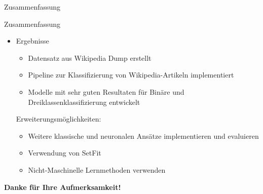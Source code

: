 \documentclass[aspectratio=169]{beamer} %
\begin{document}
\begin{frame}{Zusammenfassung}
    \begin{block}{Zusammenfassung}
        \begin{itemize}
            \item Ergebnisse
                  \begin{itemize}
                      \item Datensatz aus Wikipedia Dump erstellt
                      \item Pipeline zur Klassifizierung von Wikipedia-Artikeln implementiert
                      \item Modelle mit sehr guten Resultaten für Binäre und Dreiklassenklassifizierung entwickelt
                  \end{itemize}
                  Erweiterungsmöglichkeiten:
                  \begin{itemize}
                      \item Weitere klassische und neuronalen Ansätze implementieren und evaluieren
                      \item Verwendung von SetFit
                      \item Nicht-Maschinelle Lernmethoden verwenden
                  \end{itemize}
        \end{itemize}
    \end{block}
    
    \begin{center}
    \textbf{Danke für Ihre Aufmerksamkeit!}
    \end{center}
    
    \nocite{hendrycks2023gaussianerrorlinearunits}
    \nocite{Sanh2019DistilBERTAD}
    \nocite{tunstall2022efficientfewshotlearningprompts}
    \nocite{9783960108535}
    \nocite{article_comparing_LLMs}
    \nocite{Attention}
    \nocite{BERTReference}
    \nocite{das2024languageagnosticmodelingwikipediaarticles}
    \nocite{DBLP:journals/corr/BojanowskiGJM16}
    \nocite{eyheramendy_2003}
    \nocite{huggingfaceQuelle}
    \nocite{maron_1961}
    \nocite{pytorchRef}
    \nocite{shavarani2020multiclassmultilingualclassificationwikipedia}
    \nocite{skicitLearnRef}
    \nocite{textCategorizationWithSVM}
    \nocite{UrsprungDatensatz}
    \nocite{yang2019zerotraining}
    \nocite{yenduri2023generativepretrainedtransformercomprehensive}
    \nocite{ReservoirSampling}
    \nocite{Ansel2024}
    \nocite{Bishop2019}
    \nocite{Bojanowski2016}
    \nocite{Das2024}
    \nocite{Devlin2018}
    \nocite{Hendrycks2016}
    \nocite{Joachims1998}
    \nocite{Manning2009}
    \nocite{Mikolov2013}
    \nocite{Pedregosa2011}
    \nocite{Pennington2014}
    \nocite{Porter2006}
\end{frame}



\appendix

\end{document}

